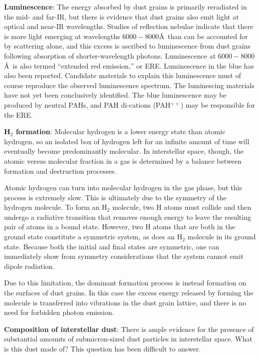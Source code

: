 \documentclass[a4paper,10pt]{article}
\begin{document}
{\noindent}\textbf{Luminescence}: The energy absorbed by dust grains is primarily reradiated in the mid- and far-IR, but there is evidence that dust grains also emit light at optical and near-IR wavelengths. Studies of reflection nebulae indicate that there is more light emerging at wavelengths $6000-8000$\AA~than can be accounted for by scattering alone, and this excess is ascribed to luminescence from dust grains following absorption of shorter-wavelength photons. Luminescence at $6000-8000$\AA~is also termed ``extended red emission,'' or ERE. Luminescence in the blue has also been reported. Candidate materials to explain this luminescence must of course reproduce the observed luminescence spectrum. The luminescing materials have not yet been conclusively identified. The blue luminescence may be produced by neutral PAHs, and PAH di-cations (PAH$^{++}$) may be responsible for the ERE.


{\noindent}\textbf{H$_2$ formation}: Molecular hydrogen is a lower energy state than atomic hydrogen, so an isolated box of hydrogen left for an infinite amount of time will eventually become predominantly molecular. In interstellar space, though, the atomic versus molecular fraction in a gas is determined by a balance between formation and destruction processes.

{\noindent}Atomic hydrogen can turn into molecular hydrogen in the gas phase, but this process is extremely slow. This is ultimately due to the symmetry of the hydrogen molecule. To form an H$_2$ molecule, two H atoms must collide and then undergo a radiative transition that removes enough energy to leave the resulting pair of atoms in a bound state. However, two H atoms that are both in the ground state constitute a symmetric system, as does an H$_2$ molecule in its ground state. Because both the initial and final states are symmetric, one can immediately show from symmetry considerations that the system cannot emit dipole radiation.

{\noindent}Due to this limitation, the dominant formation process is instead formation on the surfaces of dust grains. In this case the excess energy released by forming the molecule is transferred into vibrations in the dust grain lattice, and there is no need for forbidden photon emission.

{\noindent}\textbf{Composition of interstellar dust}: There is ample evidence for the presence of substantial amounts of submicron-sized dust particles in interstellar space. What is this dust made of? This question has been difficult to answer.
\end{document}
